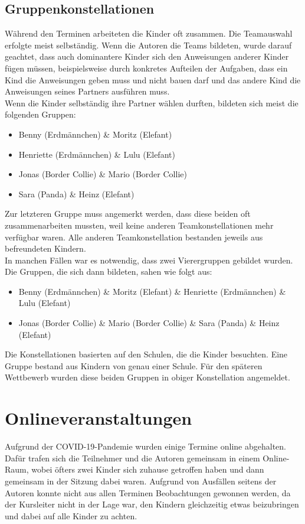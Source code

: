 \subsection{Gruppenkonstellationen}
Während den Terminen arbeiteten die Kinder oft zusammen. Die Teamauswahl erfolgte meist selbständig. Wenn die Autoren die Teams bildeten, wurde darauf geachtet, dass auch dominantere Kinder sich den Anweisungen anderer Kinder fügen müssen, beispielsweise durch konkretes Aufteilen der Aufgaben, dass ein Kind die Anweisungen geben muss und nicht bauen darf und das andere Kind die Anweisungen seines Partners ausführen muss.\\
Wenn die Kinder selbständig ihre Partner wählen durften, bildeten sich meist die folgenden Gruppen:
\begin{itemize}
	\item Benny (Erdmännchen) \& Moritz (Elefant)
	\item Henriette (Erdmännchen) \& Lulu (Elefant)
	\item Jonas (Border Collie) \& Mario (Border Collie)
	\item Sara (Panda) \& Heinz (Elefant)
\end{itemize}
Zur letzteren Gruppe muss angemerkt werden, dass diese beiden oft zusammenarbeiten mussten, weil keine anderen Teamkonstellationen mehr verfügbar waren. Alle anderen Teamkonstellation bestanden jeweils aus befreundeten Kindern.\\
In manchen Fällen war es notwendig, dass zwei Vierergruppen gebildet wurden. Die Gruppen, die sich dann bildeten, sahen wie folgt aus:
\begin{itemize}
	\item Benny (Erdmännchen) \& Moritz (Elefant) \& Henriette (Erdmännchen) \& Lulu (Elefant)
	\item Jonas (Border Collie) \& Mario (Border Collie) \& Sara (Panda) \& Heinz (Elefant)
\end{itemize}
Die Konstellationen basierten auf den Schulen, die die Kinder besuchten. Eine Gruppe bestand aus Kindern von genau einer Schule. Für den späteren Wettbewerb wurden diese beiden Gruppen in obiger Konstellation angemeldet.\\


\section{Onlineveranstaltungen}
Aufgrund der COVID-19-Pandemie wurden einige Termine online abgehalten. Dafür trafen sich die Teilnehmer und die Autoren gemeinsam in einem Online-Raum, wobei öfters zwei Kinder sich zuhause getroffen haben und dann gemeinsam in der Sitzung dabei waren. Aufgrund von Ausfällen seitens der Autoren konnte nicht aus allen Terminen Beobachtungen gewonnen werden, da der Kursleiter nicht in der Lage war, den Kindern gleichzeitig etwas beizubringen und dabei auf alle Kinder zu achten.\\

